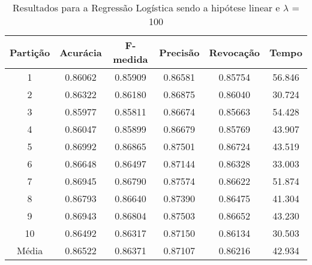 \begin{table}[h]
\centering
\caption{Resultados para a Regressão Logística sendo a hipótese linear e \(\lambda\) = 100}
\vspace{0.2cm}
\begin{tabular}{c|c|c|c|c|c}
Partição & Acurácia & F-medida & Precisão & Revocação & Tempo \\
\hline
1  & 0.86062 & 0.85909 & 0.86581 & 0.85754 & 56.846 \\      
2  & 0.86322 & 0.86180 & 0.86875 & 0.86040 & 30.724 \\      
3  & 0.85977 & 0.85811 & 0.86674 & 0.85663 & 54.428 \\      
4  & 0.86047 & 0.85899 & 0.86679 & 0.85769 & 43.907 \\      
5  & 0.86992 & 0.86865 & 0.87501 & 0.86724 & 43.519 \\      
6  & 0.86648 & 0.86497 & 0.87144 & 0.86328 & 33.003 \\      
7  & 0.86945 & 0.86790 & 0.87574 & 0.86622 & 51.874 \\    
8  & 0.86793 & 0.86640 & 0.87390 & 0.86475 & 41.304 \\      
9  & 0.86943 & 0.86804 & 0.87503 & 0.86652 & 43.230 \\      
10 & 0.86492 & 0.86317 & 0.87150 & 0.86134 & 30.503 \\
\hline
Média & 0.86522 & 0.86371 & 0.87107 & 0.86216 & 42.934

\end{tabular} 
\label{table:resultadosRL}
\end{table}

